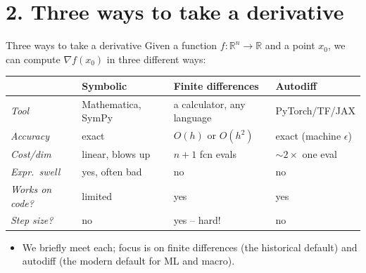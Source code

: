 \documentclass[aspectratio=169,11pt]{beamer}
\newcommand{\emphc}[1]{\textcolor{harvardcrimson}{#1}}
\newcommand{\R}{\mathbb{R}}
\begin{document}

\section*{2. Three ways to take a derivative}

\begin{frame}{Three ways to take a derivative}
\footnotesize
Given a function $f:\R^n \to \R$ and a point $x_0$, we can compute $\nabla f(x_0)$ in three different ways:
\vspace{3pt}
\begin{center}
\renewcommand{\arraystretch}{1.2}
\begin{tabular}{p{2.4cm} p{3.4cm} p{3.8cm} p{2.8cm}}
\toprule
& \textbf{Symbolic} & \textbf{Finite differences} & \textbf{Autodiff} \\
\midrule
\emph{Tool} & Mathematica, SymPy & a calculator, any language & PyTorch/TF/JAX \\
\emph{Accuracy} & exact & $O(h)$ or $O(h^2)$ & exact (machine $\epsilon$) \\
\emph{Cost/dim} & linear, blows up & \emphc{$n+1$ fcn evals} & \emphc{$\sim 2\times$ one eval} \\
\emph{Expr.\ swell} & yes, often bad & no & no \\
\emph{Works on code?} & limited & yes & yes \\
\emph{Step size?} & no & \emphc{yes -- hard!} & no \\
\bottomrule
\end{tabular}
\end{center}
\vspace{4pt}
\begin{itemize}\itemsep2pt
\item We briefly meet each; focus is on \emphc{finite differences} (the historical default) and \emphc{autodiff} (the modern default for ML and macro).
\end{itemize}
\end{frame}
\end{document}

